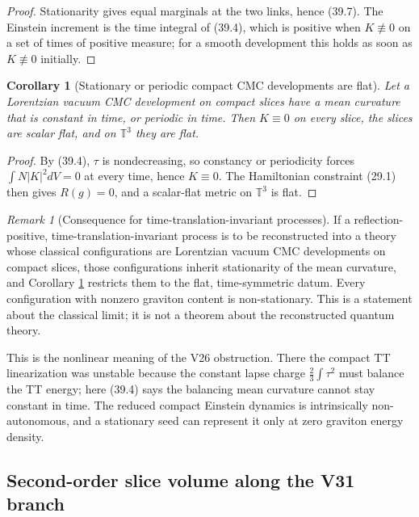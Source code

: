 \documentclass[11pt]{article}
\newtheorem{corollary}[theorem]{Corollary}
\theoremstyle{remark}
\newtheorem{remark}[theorem]{Remark}
\begin{document}
\begin{proof}
Stationarity gives equal marginals at the two links, hence (39.7).  The
Einstein increment is the time integral of (39.4), which is positive
when \(K\not\equiv0\) on a set of times of positive measure; for a
smooth development this holds as soon as \(K\not\equiv0\) initially.
\end{proof}

\begin{corollary}[Stationary or periodic compact CMC developments are flat]
\label{cor:v19v36-no-stationary}
Let a Lorentzian vacuum CMC development on compact slices have a mean
curvature that is constant in time, or periodic in time.  Then
\(K\equiv0\) on every slice, the slices are scalar flat, and on
\(\mathbb T^3\) they are flat.
\end{corollary}

\begin{proof}
By (39.4), \(\tau\) is nondecreasing, so constancy or periodicity forces
\(\int N|K|^2dV=0\) at every time, hence \(K\equiv0\).  The Hamiltonian
constraint (29.1) then gives \(R(g)=0\), and a scalar-flat metric on
\(\mathbb T^3\) is flat.
\end{proof}

\begin{remark}[Consequence for time-translation-invariant processes]
\label{rem:v19v36-stationary}
If a reflection-positive, time-translation-invariant process is to be
reconstructed into a theory whose classical configurations are
Lorentzian vacuum CMC developments on compact slices, those
configurations inherit stationarity of the mean curvature, and Corollary
\ref{cor:v19v36-no-stationary} restricts them to the flat, time-symmetric
datum.  Every configuration with nonzero graviton content is
non-stationary.  This is a statement about the classical limit; it is
not a theorem about the reconstructed quantum theory.
\end{remark}

This is the nonlinear meaning of the V26 obstruction.  There the
compact TT linearization was unstable because the constant lapse charge
\(\tfrac23\int\tau^2\) must balance the TT energy; here (39.4) says the
balancing mean curvature cannot stay constant in time.  The reduced
compact Einstein dynamics is intrinsically non-autonomous, and a
stationary seed can represent it only at zero graviton energy density.

\subsection{Second-order slice volume along the V31 branch}
\end{document}
